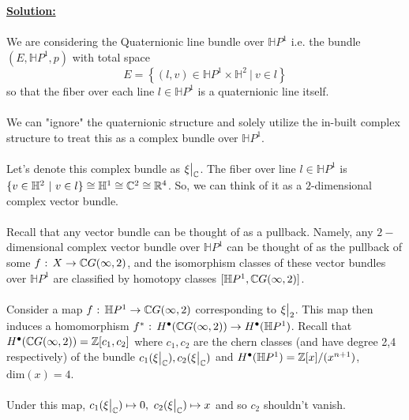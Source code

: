 \documentclass[11pt]{article}
\begin{document}
\vskip 0.5cm
\textbf{\underline{Solution:}}
\\
\\
We are considering the Quaternionic line bundle over $\mathbb{H}P^{1}$ i.e. the bundle $(E, \mathbb{H}P^1, p)$ with total space $$ E = \left\{ (l, v) \in \mathbb{H}P^1 \times \mathbb{H}^2 ~|~ v \in l \right\} $$ so that the fiber over each line $l \in \mathbb{H}P^1$ is a quaternionic line itself.
\\
\\
We can "ignore" the quaternionic structure and solely utilize the in-built complex structure to treat this as a complex bundle over $\mathbb{H}P^1$.
\\
\\
Let's denote this complex bundle as $\restr{\xi}{\C}$.
The fiber over line $l \in \mathbb{H}P^1$ is $\{ v \in \mathbb{H}^2 ~|~ v \in l \} \cong  \mathbb{H}^1 \cong \mathbb{C}^2 \cong \mathbb{R}^4$. So, we can think of it as a $2$-dimensional complex vector bundle.
\\
\\
Recall that any vector bundle can be thought of as a pullback. Namely, any $2-$dimensional complex vector bundle over $\mathbb{H}P^1$ can be thought of as the pullback of some $f \text{ : } X \rightarrow \mathbb{C} G(\infty, 2)$, and the isomorphism classes of these vector bundles over $\mathbb{H}P^1$ are classified by homotopy classes $[\mathbb{H}P^1, \mathbb{C} G(\infty, 2)]$.
\\
\\
Consider a map $f \text{ : } \mathbb{H}P^1 \rightarrow \mathbb{C} G(\infty, 2) $ corresponding to $\restr{\xi}{2}$. This map then induces a homomorphism $f^* \text{ : } H^{\bullet}(\mathbb{C} G(\infty, 2)) \rightarrow H^{\bullet}(\mathbb{H}P^1)$. Recall that $H^{\bullet}(\mathbb{C} G(\infty,2)) = \mathbb{Z}[c_1, c_2]$ where $c_1, c_2$ are the chern classes (and have degree 2,4 respectively) of the bundle $c_1(\restr{\xi}{\C}), c_2(\restr{\xi}{\C})$ and $H^{\bullet}(\mathbb{H}P^1) = \mathbb{Z}[x]/(x^{n+1})$, $\mathrm{dim}(x) = 4$. 
\\
\\
Under this map, $c_1(\restr{\xi}{\C}) \mapsto 0, ~c_2(\restr{\xi}{\C}) \mapsto x$ and so $c_2$ shouldn't vanish.
\\
\end{document}
